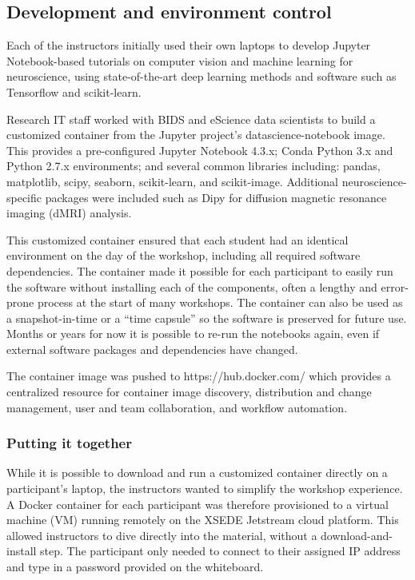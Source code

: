 \subsection{Development and environment control}

Each of the instructors initially used their own laptops to develop Jupyter
Notebook-based tutorials on computer vision and machine learning for
neuroscience, using state-of-the-art deep learning methods and software such as
Tensorflow and scikit-learn.

Research IT staff worked with BIDS and eScience data scientists to build a
customized container from the Jupyter project’s datascience-notebook image. This
provides a pre-configured Jupyter Notebook 4.3.x; Conda Python 3.x and Python
2.7.x environments; and several common libraries including: pandas, matplotlib,
scipy, seaborn, scikit-learn, and scikit-image. Additional neuroscience-specific
packages were included such as Dipy for diffusion magnetic resonance imaging
(dMRI) analysis.

This customized container ensured that each student had an identical environment
on the day of the workshop, including all required software dependencies. The
container made it possible for each participant to easily run the software
without installing each of the components, often a lengthy and error-prone
process at the start of many workshops. The container can also be used as a
snapshot-in-time or a “time capsule” so the software is preserved for future
use. Months or years for now it is possible to re-run the notebooks again, even
if external software packages and dependencies have changed.

The container image was pushed to https://hub.docker.com/ which provides a
centralized resource for container image discovery, distribution and change
management, user and team collaboration, and workflow automation.

\subsubsection{Putting it together}

While it is possible to download and run a customized container directly on a
participant’s laptop, the instructors wanted to simplify the workshop
experience. A Docker container for each participant was therefore provisioned to
a virtual machine (VM) running remotely on the XSEDE Jetstream cloud platform.
This allowed instructors to dive directly into the material, without a
download-and-install step. The participant only needed to connect to their
assigned IP address and type in a password provided on the whiteboard.

